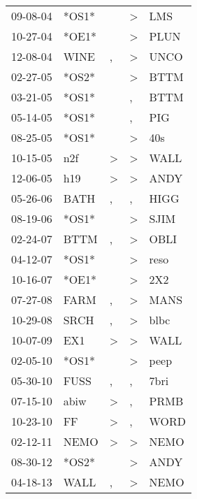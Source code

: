\begin{supertabular}{lllll}
 09-08-04 &  *OS1* &                  &     \textgreater &    LMS \\
 10-27-04 &  *OE1* &                  &     \textgreater &   PLUN \\
 12-08-04 &   WINE &                , &     \textgreater &   UNCO \\
 02-27-05 &  *OS2* &                  &     \textgreater &   BTTM \\
 03-21-05 &  *OS1* &                  &                , &   BTTM \\
 05-14-05 &  *OS1* &                  &                , &    PIG \\
 08-25-05 &  *OS1* &                  &     \textgreater &    40s \\
 10-15-05 &    n2f &     \textgreater &     \textgreater &   WALL \\
 12-06-05 &    h19 &     \textgreater &     \textgreater &   ANDY \\
 05-26-06 &   BATH &                , &                , &   HIGG \\
 08-19-06 &  *OS1* &                  &     \textgreater &   SJIM \\
 02-24-07 &   BTTM &                , &     \textgreater &   OBLI \\
 04-12-07 &  *OS1* &                  &     \textgreater &   reso \\
 10-16-07 &  *OE1* &                  &     \textgreater &    2X2 \\
 07-27-08 &   FARM &                , &     \textgreater &   MANS \\
 10-29-08 &   SRCH &                , &     \textgreater &   blbc \\
 10-07-09 &    EX1 &     \textgreater &     \textgreater &   WALL \\
 02-05-10 &  *OS1* &                  &     \textgreater &   peep \\
 05-30-10 &   FUSS &                , &                , &   7bri \\
 07-15-10 &   abiw &     \textgreater &                , &   PRMB \\
 10-23-10 &     FF &     \textgreater &                , &   WORD \\
 02-12-11 &   NEMO &     \textgreater &     \textgreater &   NEMO \\
 08-30-12 &  *OS2* &                  &     \textgreater &   ANDY \\
 04-18-13 &   WALL &                , &     \textgreater &   NEMO \\

\end{supertabular}
